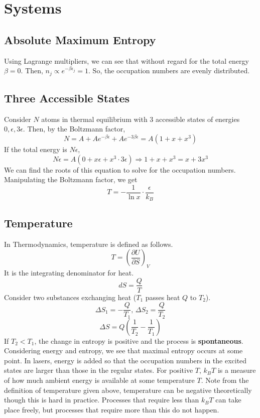 \documentclass[../main.tex]{subfiles}
\newcommand{\pder}[3]{\left(\frac{\partial #1}{\partial #2}\right)_{#3}}
\begin{document}
\section{Systems}
\subsection{Absolute Maximum Entropy}
Using Lagrange multipliers, we can see that without regard for the total energy $\beta=0$. Then, $n_{j}\propto e^{-\beta \epsilon_{j}}=1$.
So, the occupation numbers are evenly distributed. 

\subsection{Three Accessible States}
Consider $N$ atoms in thermal equilibrium with 3 accessible states of energies $0,\epsilon,3\epsilon$.
Then, by the Boltzmann factor, 
$$N=A+Ae^{-\beta \epsilon}+Ae^{-3\beta \epsilon}=A(1+x+x^{3})$$
If the total energy is $N\epsilon$,
$$N\epsilon=A(0+x\epsilon+x^{3}\cdot 3\epsilon)\Rightarrow 1+x+x^{3}=x+3x^{3}$$
We can find the roots of this equation to solve for the occupation numbers.
Manipulating the Boltzmann factor, we get 
$$T=-\frac{1}{\ln x}\cdot \frac{\epsilon}{k_{B}}$$

\subsection{Temperature}
In Thermodynamics, temperature is defined as follows. 
$$T=\pder{U}{S}{V}$$
It is the integrating denominator for heat.
$$dS=\frac{Q}{T}$$
Consider two substances exchanging heat ($T_{1}$ passes heat $Q$ to $T_{2}$).
$$\Delta S_{1}=-\frac{Q}{T_{1}},\, \Delta S_{2}=\frac{Q}{T_{2}}$$
$$\Delta S=Q\left(\frac{1}{T_{2}}-\frac{1}{T_{1}}\right)$$
If $T_{2}<T_{1}$, the change in entropy is positive and the process is \textbf{spontaneous}.
Considering energy and entropy, we see that maximal entropy occurs at some point. In lasers,
energy is added so that the occupation numbers in the excited states are larger than those in
the regular states. For positive $T$, $k_{B}T$ is a measure of how much ambient energy is available at some temperature
$T$. Note from the definition of temperature given above, temperature can be negative theoretically
though this is hard in practice. Processes that require less than $k_{B}T$ can take place freely, but 
processes that require more than this do not happen.
\end{document}

